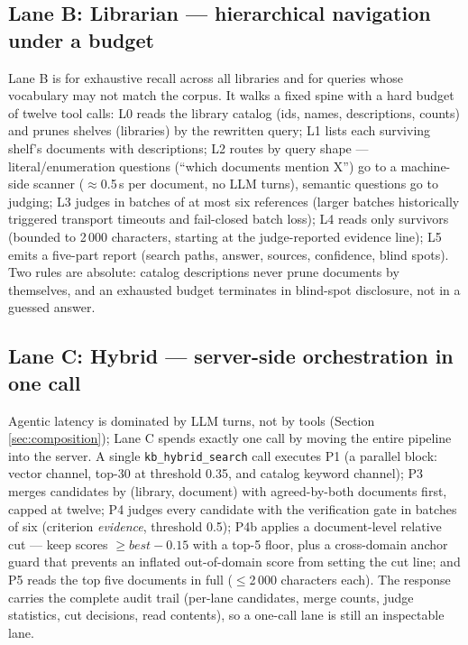 \documentclass[preprint,12pt]{elsarticle}
\begin{document}
\subsection{Lane B: Librarian --- hierarchical navigation under a budget}
Lane B is for exhaustive recall across all libraries and for queries whose
vocabulary may not match the corpus. It walks a fixed spine with a hard
budget of twelve tool calls: L0 reads the library catalog (ids, names,
descriptions, counts) and prunes shelves (libraries) by the rewritten
query; L1 lists
each surviving shelf's documents with descriptions; L2 routes by query
shape --- literal/enumeration questions (``which documents mention X'') go
to a machine-side scanner ($\approx$0.5\,s per document, no LLM turns),
semantic questions go to judging; L3 judges in batches of at most six
references (larger batches historically triggered transport timeouts and
fail-closed batch loss); L4 reads only survivors (bounded to 2\,000
characters, starting at the judge-reported evidence line); L5 emits a
five-part report (search paths, answer, sources, confidence, blind spots).
Two rules are absolute: catalog descriptions never prune documents by
themselves, and an exhausted budget terminates in blind-spot disclosure,
not in a guessed answer.

\subsection{Lane C: Hybrid --- server-side orchestration in one call}
Agentic latency is dominated by LLM turns, not by tools (Section
\ref{sec:composition}); Lane C spends exactly one call by moving the entire
pipeline into the server. A single \texttt{kb\_hybrid\_search} call executes
P1 (a parallel block: vector channel, top-30 at threshold 0.35, and catalog
keyword channel); P3 merges candidates by (library, document) with
agreed-by-both
documents first, capped at twelve; P4 judges every candidate with the
verification gate in batches of six (criterion \emph{evidence}, threshold
0.5); P4b
applies a document-level relative cut --- keep scores $\geq \mathit{best} -
0.15$ with a top-5 floor, plus a cross-domain anchor guard that prevents an
inflated out-of-domain score from setting the cut line; and P5 reads the
top five documents in full ($\leq$2\,000 characters each). The response
carries the complete audit trail (per-lane candidates, merge counts, judge
statistics, cut decisions, read contents), so a one-call lane is still an
inspectable lane.
\end{document}

